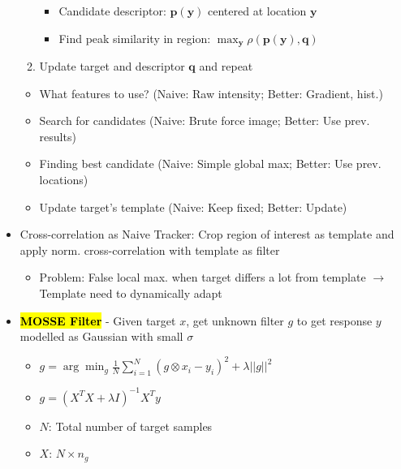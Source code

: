 \documentclass{article}
\newcommand{\keyword}[2]{\sethlcolor{highlight}\hl{\textbf{#1}} - #2}
\begin{document}
\begin{multicols*}{4}
\begin{itemize}
\begin{enumerate}
        \begin{itemize}
            \item Candidate descriptor: $\mathbf{p}(\mathbf{y})$ centered at location $\mathbf{y}$
            \item Find peak similarity in region: $\max_{\mathbf{y}} \rho (\mathbf{p}(\mathbf{y}),\mathbf{q})$
        \end{itemize}
        \item Update target and descriptor $\mathbf{q}$ and repeat
    \end{enumerate}
    \begin{itemize}
        \item What features to use? (Naive: Raw intensity; Better: Gradient, hist.)
        \item Search for candidates (Naive: Brute force image; Better: Use prev. results)
        \item Finding best candidate (Naive: Simple global max; Better: Use prev. locations)
        \item Update target's template (Naive: Keep fixed; Better: Update)
    \end{itemize}
    \item Cross-correlation as Naive Tracker: Crop region of interest as template and apply norm. cross-correlation with template as filter
    \begin{itemize}
        \item Problem: False local max. when target differs a lot from template $\rightarrow$ Template need to dynamically adapt
    \end{itemize}
    \item \keyword{MOSSE Filter}{Given target $x$, get unknown filter $g$ to get response $y$ modelled as Gaussian with small $\sigma$}
    \begin{itemize}
        \item $g = \arg \min_g \frac{1}{N} \sum_{i=1}^{N} (g \otimes x_i - y_i)^2 + \lambda||g||^2$
        \item $g = (X^T X + \lambda I)^{-1}X^Ty$
        \item $N$: Total number of target samples
        \item $X$: $N \times n_g$


\end{itemize}
\end{itemize}
\end{multicols*}
\end{document}
